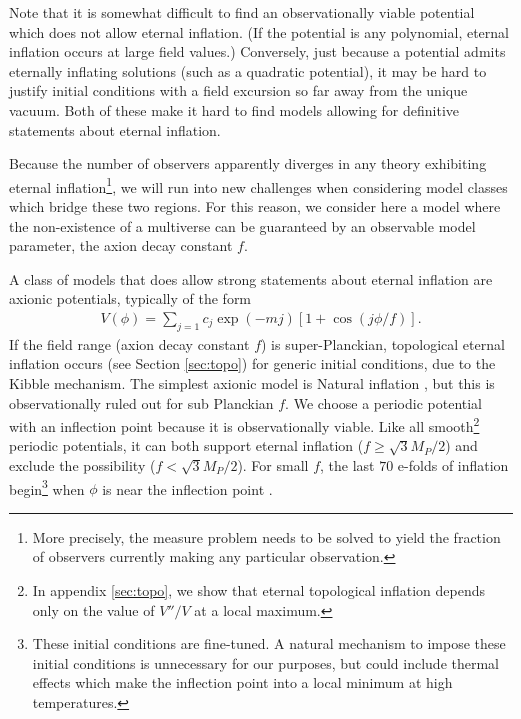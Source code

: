 \documentclass[aps,amsfonts,amsmath,prd,preprint,nofootinbib]{revtex4}
\newcommand{\Mp}{{M_{P}}}
\begin{document}
 Note that it is somewhat difficult to find an observationally viable potential which does not allow eternal inflation\cite{Mukhanov:2014uwa}.  (If the
potential is any polynomial, eternal inflation occurs at large field values.) %
Conversely, just because a potential admits eternally inflating solutions (such as a quadratic potential), it may be hard to justify initial conditions with a field excursion so far away from the unique vacuum.  
Both of these make it hard to find models allowing for definitive statements about eternal inflation.

 
 
Because the number of observers apparently diverges in any theory exhibiting eternal inflation\footnote{More precisely, 
the measure problem needs to be solved to yield the fraction of observers currently making any particular observation.}, 
we will run into new challenges when considering model classes which bridge these two regions.  
For this reason, we consider here a model where the non-existence of a multiverse can be guaranteed by an observable model parameter,  the axion decay constant $f$.



A class of models that does allow strong statements about eternal inflation are axionic potentials, typically of the form \cite{shiu}
\begin{align}
V(\phi) = \sum_{j=1} c_j \exp(- m j)\left[1 + \cos(j\phi/f)\right].
\end{align}
If the field range (axion decay constant $f$) is super-Planckian, topological 
eternal inflation \cite{Vilenkin:1994pv,Linde:1994wt} occurs (see Section \ref{sec:topo}) for generic initial conditions, due to the Kibble mechanism.  
The simplest axionic model is Natural inflation \cite{freese}, but this is observationally ruled out for sub Planckian $f$.
We choose a periodic potential with an inflection point  because it is observationally viable.  
Like all smooth\footnote{In appendix \ref{sec:topo}, we show that eternal topological inflation depends only on the value of $V''/V$ at a local maximum.} periodic potentials, it can both support eternal inflation ($f \geq \sqrt{3}\Mp/2$) and exclude the possibility ($f < \sqrt{3}\Mp/2$).  
For small $f$, the last $70$ e-folds of inflation begin\footnote{
	These initial conditions are fine-tuned.  A natural mechanism to impose these initial conditions is unnecessary for our purposes, but could 
	include thermal effects which make the inflection point into a local minimum at high temperatures.}
when $\phi$ is near the inflection point \cite{Martin:2013tda, Allahverdi:2008bt, Hotchkiss:2011am,Musoke:2017frr}.
\end{document}
